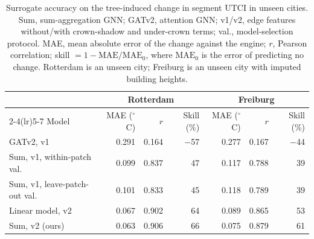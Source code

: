 \begin{table}[tbp]
\centering
\small
\setlength{\tabcolsep}{5pt}
\caption{Surrogate accuracy on the tree-induced change in segment UTCI in unseen cities. Sum, sum-aggregation GNN; GATv2, attention GNN; v1/v2, edge features without/with crown-shadow and under-crown terms; val., model-selection protocol. MAE, mean absolute error of the change against the engine; $r$, Pearson correlation; skill $= 1 - \mathrm{MAE}/\mathrm{MAE}_0$, where $\mathrm{MAE}_0$ is the error of predicting no change. Rotterdam is an unseen city; Freiburg is an unseen city with imputed building heights.}
\label{tab:T3_surrogates}
\begin{tabular}{lrrrrrr}
\toprule
 & \multicolumn{3}{c}{Rotterdam} & \multicolumn{3}{c}{Freiburg} \\
\cmidrule(lr){2-4}\cmidrule(lr){5-7}
Model & MAE ($^\circ$C) & $r$ & Skill (\%) & MAE ($^\circ$C) & $r$ & Skill (\%) \\
\midrule
GATv2, v1 & 0.291 & 0.164 & $-$57 & 0.277 & 0.167 & $-$44 \\
Sum, v1, within-patch val. & 0.099 & 0.837 & 47 & 0.117 & 0.788 & 39 \\
Sum, v1, leave-patch-out val. & 0.101 & 0.833 & 45 & 0.118 & 0.789 & 39 \\
Linear model, v2 & 0.067 & 0.902 & 64 & 0.089 & 0.865 & 53 \\
Sum, v2 (ours) & 0.063 & 0.906 & 66 & 0.075 & 0.879 & 61 \\
\bottomrule
\end{tabular}
\end{table}
